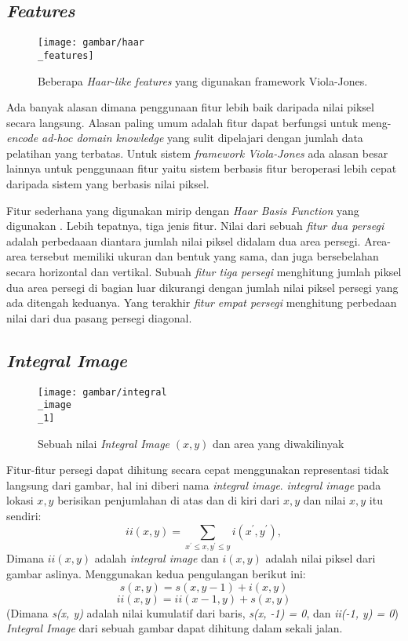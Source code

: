\subsection{\emph{Features}}

\begin{figure}[H]
  \centering{}
	\texttt{[image: gambar/haar\\\_features]}
  \caption{Beberapa \emph{Haar-like features} yang digunakan framework Viola-Jones.}
\end{figure}

Ada banyak alasan dimana penggunaan fitur lebih baik daripada 
nilai piksel secara langsung. Alasan paling umum adalah fitur dapat berfungsi
untuk meng-\emph{encode ad-hoc domain knowledge} yang sulit dipelajari 
dengan jumlah data pelatihan yang terbatas. Untuk sistem \emph{framework Viola-Jones} 
ada alasan besar lainnya untuk penggunaan fitur yaitu sistem berbasis fitur beroperasi lebih cepat
daripada sistem yang berbasis nilai piksel.

Fitur sederhana yang digunakan mirip dengan \emph{Haar Basis Function} yang 
digunakan \cite{papaetal}. Lebih tepatnya, tiga jenis fitur. 
Nilai dari sebuah \emph{fitur dua persegi} adalah perbedaaan diantara 
jumlah nilai piksel didalam dua area persegi. Area-area tersebut memiliki 
ukuran dan bentuk yang sama, dan juga bersebelahan secara horizontal dan vertikal.
Subuah \emph{fitur tiga persegi} menghitung jumlah piksel dua area persegi 
di bagian luar dikurangi dengan jumlah nilai piksel persegi yang ada ditengah keduanya. 
Yang terakhir \emph{fitur empat persegi} menghitung perbedaan nilai dari dua pasang 
persegi diagonal.

\subsection{\emph{Integral Image}}

\begin{figure}[H]
  \centering{}
	\texttt{[image: gambar/integral\\\_image\\\_1]}
  \caption{Sebuah nilai \emph{Integral Image} $(x,y)$ dan area yang diwakilinyak}
\end{figure}

Fitur-fitur persegi dapat dihitung secara cepat menggunakan 
representasi tidak langsung dari gambar, hal ini diberi nama 
\emph{integral image}. \emph{integral image} pada lokasi $x, y$ berisikan 
penjumlahan di atas dan di kiri dari $x, y$ dan nilai $x, y$ itu sendiri:
\begin{equation}
  i i(x, y)=\sum_{x^{\prime} \leq x, y^{\prime} \leq y} i\left(x^{\prime}, y^{\prime}\right),
\end{equation}
Dimana $ii(x,y)$ adalah \emph{integral image} dan $i(x,y)$ 
adalah nilai piksel dari gambar aslinya. Menggunakan kedua 
pengulangan berikut ini:
\begin{equation}
  s(x, y)=s(x, y-1) + i(x, y)
\end{equation}
\begin{equation}
  ii(x, y)=ii(x-1, y) + s(x, y)
\end{equation}
(Dimana \emph{s(x, y)} adalah nilai kumulatif dari baris, \emph{s(x, -1) = 0}, 
dan \emph{ii(-1, y) = 0}) \emph{Integral Image} dari sebuah gambar dapat dihitung dalam sekali jalan.

